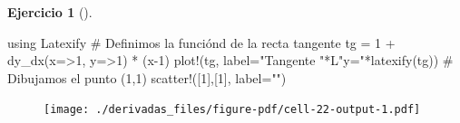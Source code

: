 \documentclass[
  a4paper,
]{scrreport}
\newenvironment{Shaded}{\begin{snugshade}}{\end{snugshade}}
\newcommand{\BuiltInTok}[1]{\textcolor[rgb]{0.00,0.23,0.31}{#1}}
\newcommand{\CommentTok}[1]{\textcolor[rgb]{0.37,0.37,0.37}{#1}}
\newcommand{\FloatTok}[1]{\textcolor[rgb]{0.68,0.00,0.00}{#1}}
\newcommand{\FunctionTok}[1]{\textcolor[rgb]{0.28,0.35,0.67}{#1}}
\newcommand{\ImportTok}[1]{\textcolor[rgb]{0.00,0.46,0.62}{#1}}
\newcommand{\NormalTok}[1]{\textcolor[rgb]{0.00,0.23,0.31}{#1}}
\newcommand{\OperatorTok}[1]{\textcolor[rgb]{0.37,0.37,0.37}{#1}}
\newcommand{\StringTok}[1]{\textcolor[rgb]{0.13,0.47,0.30}{#1}}
\theoremstyle{definition}
\newtheorem{exercise}{Ejercicio}[chapter]
\theoremstyle{remark}
\begin{document}
\begin{exercise}[]
\begin{tcolorbox}
\begin{Shaded}
\begin{Highlighting}[]
\ImportTok{using} \BuiltInTok{Latexify}
\CommentTok{\# Definimos la funciónd de la recta tangente}
\NormalTok{tg }\OperatorTok{=} \FloatTok{1} \OperatorTok{+} \FunctionTok{dy\_dx}\NormalTok{(x}\OperatorTok{=\textgreater{}}\FloatTok{1}\NormalTok{, y}\OperatorTok{=\textgreater{}}\FloatTok{1}\NormalTok{) }\OperatorTok{*}\NormalTok{ (x}\OperatorTok{{-}}\FloatTok{1}\NormalTok{)}
\FunctionTok{plot!}\NormalTok{(tg, label}\OperatorTok{=}\StringTok{"Tangente "}\OperatorTok{*}\NormalTok{L}\StringTok{"y="}\FunctionTok{*latexify}\NormalTok{(tg))}
\CommentTok{\# Dibujamos el punto (1,1)}
\FunctionTok{scatter!}\NormalTok{([}\FloatTok{1}\NormalTok{],[}\FloatTok{1}\NormalTok{], label}\OperatorTok{=}\StringTok{""}\NormalTok{)}
\end{Highlighting}
\end{Shaded}

\begin{figure}[H]

{\centering \texttt{[image: ./derivadas\_files/figure-pdf/cell-22-output-1.pdf]}

}

\end{figure}

\end{tcolorbox}

\end{exercise}
\end{document}

